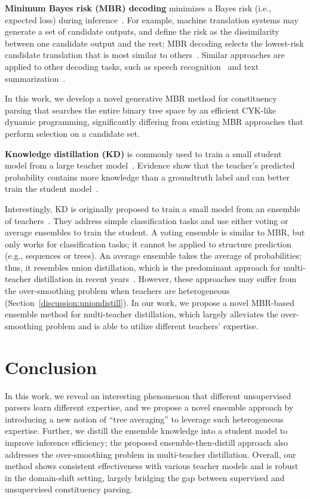 \documentclass{article}
\begin{document}
\textbf{Minimum Bayes risk (MBR) decoding} minimizes a Bayes risk (i.e., expected loss) during inference~\citep{MBRbook}. For example, machine translation systems may generate a set of candidate outputs, and define the risk as the dissimilarity between one candidate output and the rest; MBR decoding selects the lowest-risk candidate translation that is most similar to others~\citep{kumar-byrne-2004-minimum,10.1162/tacl_a_00491,suzgun-etal-2023-follow}. Similar approaches are applied to other decoding tasks, such as speech recognition~\citep{inproceedingsspeechrecognition} and text summarization~\citep{suzgun-etal-2023-follow}.

In this work, we develop a novel generative MBR method for constituency parsing that searches the entire binary tree space by an efficient CYK-like dynamic programming, significantly differing from existing MBR approaches that perform selection on a candidate set.

\textbf{Knowledge distillation (KD)} is commonly used to train a small student model from a large teacher model~\citep{sun-etal-2019-patient,jiao-etal-2020-tinybert}. Evidence show that the teacher's predicted probability contains more knowledge than a groundtruth label and can better train the student model~\citep{hinton2015distilling,wen-etal-2023-f}.

Interestingly, KD is originally proposed to train a small model from an ensemble of teachers~\citep{KDoriginal,hinton2015distilling}. They address simple classification tasks and use either voting or average ensembles to train the student. A voting ensemble is similar to MBR, but only works for classification tasks; it cannot be applied to structure prediction (e.g., sequences or trees). An average ensemble takes the average of probabilities; thus, it resembles union distillation, which is the predominant approach for multi-teacher distillation in recent years~\citep{wu-etal-2021-one,yang2020model}.
However, these approaches may suffer from the over-smoothing problem when teachers are heterogeneous (Section~\ref{discussion:uniondistill}).
In our work, we propose a novel MBR-based ensemble method for multi-teacher distillation, which largely alleviates the over-smoothing problem and is able to utilize different teachers' expertise.

\section{Conclusion}
In this work, we reveal an interesting phenomenon that different unsupervised parsers learn different expertise, and we propose a novel ensemble approach by introducing a new notion of ``tree averaging'' to leverage such heterogeneous expertise. Further, we distill the ensemble knowledge into a student model to improve inference efficiency; the proposed ensemble-then-distill approach also addresses the over-smoothing problem in multi-teacher distillation. Overall, our method shows consistent effectiveness with various teacher models and is robust in the domain-shift setting, largely bridging the gap between supervised and unsupervised constituency parsing.
\end{document}
